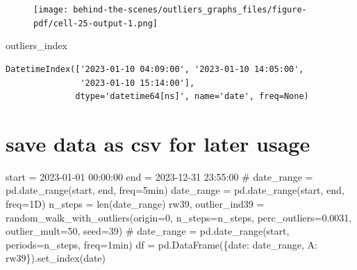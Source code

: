 \documentclass[
  letterpaper,
  DIV=11,
  numbers=noendperiod,
  oneside]{scrreprt}
\newenvironment{Shaded}{\begin{snugshade}}{\end{snugshade}}
\newcommand{\BuiltInTok}[1]{\textcolor[rgb]{0.00,0.23,0.31}{#1}}
\newcommand{\CommentTok}[1]{\textcolor[rgb]{0.37,0.37,0.37}{#1}}
\newcommand{\DecValTok}[1]{\textcolor[rgb]{0.68,0.00,0.00}{#1}}
\newcommand{\FloatTok}[1]{\textcolor[rgb]{0.68,0.00,0.00}{#1}}
\newcommand{\NormalTok}[1]{\textcolor[rgb]{0.00,0.23,0.31}{#1}}
\newcommand{\OperatorTok}[1]{\textcolor[rgb]{0.37,0.37,0.37}{#1}}
\newcommand{\StringTok}[1]{\textcolor[rgb]{0.13,0.47,0.30}{#1}}
\begin{document}
\begin{figure}[H]

{\centering \texttt{[image: behind-the-scenes/outliers\_graphs\_files/figure-pdf/cell-25-output-1.png]}

}

\end{figure}

\begin{Shaded}
\begin{Highlighting}[]
\NormalTok{outliers\_index}
\end{Highlighting}
\end{Shaded}

\begin{verbatim}
DatetimeIndex(['2023-01-10 04:09:00', '2023-01-10 14:05:00',
               '2023-01-10 15:14:00'],
              dtype='datetime64[ns]', name='date', freq=None)
\end{verbatim}

\hypertarget{save-data-as-csv-for-later-usage}{%
\section{save data as csv for later
usage}\label{save-data-as-csv-for-later-usage}}

\begin{Shaded}
\begin{Highlighting}[]
\NormalTok{start }\OperatorTok{=} \StringTok{\textquotesingle{}2023{-}01{-}01 00:00:00\textquotesingle{}}
\NormalTok{end }\OperatorTok{=} \StringTok{\textquotesingle{}2023{-}12{-}31 23:55:00\textquotesingle{}}
\CommentTok{\# date\_range = pd.date\_range(start, end, freq=\textquotesingle{}5min\textquotesingle{})}
\NormalTok{date\_range }\OperatorTok{=}\NormalTok{ pd.date\_range(start, end, freq}\OperatorTok{=}\StringTok{\textquotesingle{}1D\textquotesingle{}}\NormalTok{)}
\NormalTok{n\_steps }\OperatorTok{=} \BuiltInTok{len}\NormalTok{(date\_range)}
\NormalTok{rw39, outlier\_ind39 }\OperatorTok{=}\NormalTok{ random\_walk\_with\_outliers(origin}\OperatorTok{=}\DecValTok{0}\NormalTok{,}
\NormalTok{                                            n\_steps}\OperatorTok{=}\NormalTok{n\_steps,}
\NormalTok{                                            perc\_outliers}\OperatorTok{=}\FloatTok{0.0031}\NormalTok{,}
\NormalTok{                                            outlier\_mult}\OperatorTok{=}\DecValTok{50}\NormalTok{,}
\NormalTok{                                            seed}\OperatorTok{=}\DecValTok{39}\NormalTok{)}
\CommentTok{\# date\_range = pd.date\_range(start, periods=n\_steps, freq=\textquotesingle{}1min\textquotesingle{})}
\NormalTok{df }\OperatorTok{=}\NormalTok{ pd.DataFrame(\{}\StringTok{\textquotesingle{}date\textquotesingle{}}\NormalTok{: date\_range, }\StringTok{\textquotesingle{}A\textquotesingle{}}\NormalTok{: rw39\}).set\_index(}\StringTok{\textquotesingle{}date\textquotesingle{}}\NormalTok{)}
\end{Highlighting}
\end{Shaded}
\end{document}
